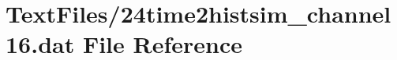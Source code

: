 \hypertarget{24time2histsim__channel16_8dat}{}\section{Text\+Files/24time2histsim\+\_\+channel16.dat File Reference}
\label{24time2histsim__channel16_8dat}
